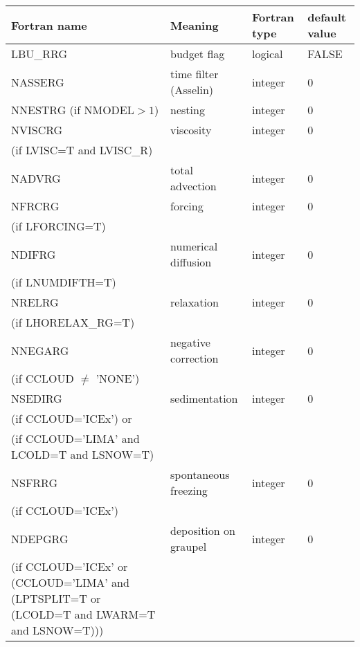 \begin{longtable} {|p{}|p{}|>{\centering}p{}|p{}<{\centering}|}
\hline
Fortran name & Meaning & Fortran type & default value \\
\hline \hline
\endhead
LBU\_RRG & budget flag & logical & FALSE\index{LBU\_RRG!\innam{NAM\_BU\_RRG}} \\\hline
NASSERG  & time filter (Asselin)   & integer  &  0 \index{NASSERG!\innam{NAM\_BU\_RRG}} \\\hline
NNESTRG (if NMODEL$>1$) & nesting           & integer  &  0 \index{NNESTRG!\innam{NAM\_BU\_RRG}} \\\hline
NVISCRG  & viscosity         & integer  &  0 \index{NVISCRG!\innam{NAM\_BU\_RRG}}\\
(if LVISC=T and LVISC\_R) &  &   &   \\\hline
NADVRG   & total advection   & integer  &  0 \index{NADVRG!\innam{NAM\_BU\_RRG}}\\\hline
NFRCRG   & forcing           & integer  &  0 \index{NFRCRG!\innam{NAM\_BU\_RRG}} \\ \nopagebreak
(if LFORCING=T) &  &   &   \\\hline
NDIFRG   & numerical diffusion & integer  &  0 \index{NDIFRG!\innam{NAM\_BU\_RRG}} \\ \nopagebreak
(if LNUMDIFTH=T) &  &   &   \\\hline
NRELRG   & relaxation        & integer  &  0 \index{NRELRG!\innam{NAM\_BU\_RRG}}\\ \nopagebreak
(if LHORELAX\_RG=T) &  &   &   \\\hline
NNEGARG  & negative correction & integer  &  0 \index{NNEGARG!\innam{NAM\_BU\_RRG}}\\ \nopagebreak
(if CCLOUD $\neq$ 'NONE') & &   &  \\\hline
NSEDIRG  & sedimentation     & integer  &  0 \index{NSEDIRG!\innam{NAM\_BU\_RRG}}\\ \nopagebreak
(if CCLOUD='ICEx') or & &   &  \\ \nopagebreak
(if CCLOUD='LIMA' and LCOLD=T and LSNOW=T) & &   &  \\\hline
NSFRRG  & spontaneous freezing & integer  &  0 \index{NSFRRG!\innam{NAM\_BU\_RRG}}\\ \nopagebreak
(if CCLOUD='ICEx') & &   &  \\\hline
NDEPGRG  & deposition on graupel & integer  &  0 \index{NDEPGRG!\innam{NAM\_BU\_RRG}}\\ \nopagebreak
(if CCLOUD='ICEx' or (CCLOUD='LIMA' and (LPTSPLIT=T or (LCOLD=T and LWARM=T and LSNOW=T))) & & & \\\hline

\end{longtable}
